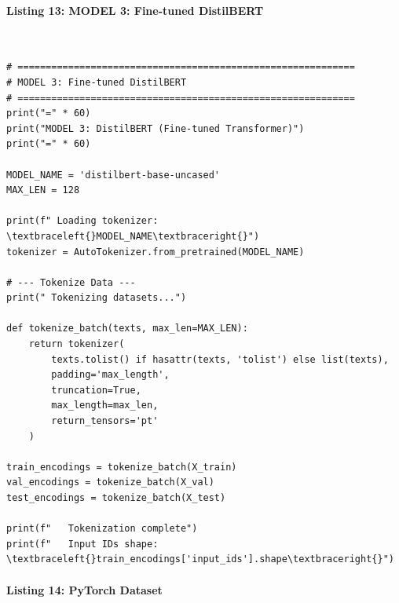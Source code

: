 \documentclass[12pt,a4paper,oneside]{report}
\begin{document}
\paragraph{Listing 13: MODEL 3: Fine-tuned DistilBERT}\mbox{}\\[-1ex]
\begin{Verbatim}[commandchars=\\\{\},breaklines=true,breakanywhere=true,fontsize=\scriptsize,frame=leftline,framesep=2mm,rulecolor=\color{gray}]
# ============================================================
# MODEL 3: Fine-tuned DistilBERT
# ============================================================
print("=" * 60)
print("MODEL 3: DistilBERT (Fine-tuned Transformer)")
print("=" * 60)

MODEL_NAME = 'distilbert-base-uncased'
MAX_LEN = 128

print(f" Loading tokenizer: \textbraceleft{}MODEL_NAME\textbraceright{}")
tokenizer = AutoTokenizer.from_pretrained(MODEL_NAME)

# --- Tokenize Data ---
print(" Tokenizing datasets...")

def tokenize_batch(texts, max_len=MAX_LEN):
    return tokenizer(
        texts.tolist() if hasattr(texts, 'tolist') else list(texts),
        padding='max_length',
        truncation=True,
        max_length=max_len,
        return_tensors='pt'
    )

train_encodings = tokenize_batch(X_train)
val_encodings = tokenize_batch(X_val)
test_encodings = tokenize_batch(X_test)

print(f"   Tokenization complete")
print(f"   Input IDs shape: \textbraceleft{}train_encodings['input_ids'].shape\textbraceright{}")
\end{Verbatim}
\paragraph{Listing 14: PyTorch Dataset}\mbox{}\\[-1ex]
\end{document}

